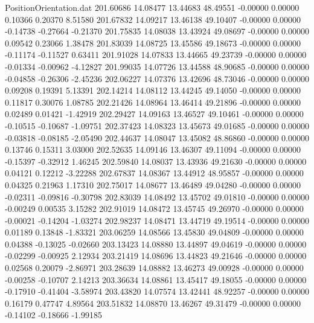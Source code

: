\begin{filecontents}{PositionOrientation.dat}
 201.60686   14.08477   13.44683    48.49551   -0.00000    0.00000    0.10366    0.20370    8.51580
 201.67832   14.09217   13.46138    49.10407   -0.00000    0.00000   -0.14738   -0.27664   -0.21370
 201.75835   14.08038   13.43924    49.08697   -0.00000    0.00000    0.09542    0.23066    1.38478
 201.83039   14.08725   13.45586    49.18673   -0.00000    0.00000   -0.11174   -0.11527    0.63411
 201.91028   14.07833   13.44665    49.23739   -0.00000    0.00000   -0.01334   -0.00962   -4.12827
 201.99035   14.07726   13.44588    48.90685   -0.00000    0.00000   -0.04858   -0.26306   -2.45236
 202.06227   14.07376   13.42696    48.73046   -0.00000    0.00000    0.09208    0.19391    5.13391
 202.14214   14.08112   13.44245    49.14050   -0.00000    0.00000    0.11817    0.30076    1.08785
 202.21426   14.08964   13.46414    49.21896   -0.00000    0.00000    0.02489    0.01421   -1.42919
 202.29427   14.09163   13.46527    49.10461   -0.00000    0.00000   -0.10515   -0.10687   -1.09751
 202.37423   14.08323   13.45673    49.01685   -0.00000    0.00000   -0.03818   -0.08185   -2.05490
 202.44637   14.08047   13.45082    48.86860   -0.00000    0.00000    0.13746    0.15311    3.03000
 202.52635   14.09146   13.46307    49.11094   -0.00000    0.00000   -0.15397   -0.32912    1.46245
 202.59840   14.08037   13.43936    49.21630   -0.00000    0.00000    0.04121    0.12212   -3.22288
 202.67837   14.08367   13.44912    48.95857   -0.00000    0.00000    0.04325    0.21963    1.17310
 202.75017   14.08677   13.46489    49.04280   -0.00000    0.00000   -0.02311   -0.09816   -0.30798
 202.83039   14.08492   13.45702    49.01810   -0.00000    0.00000   -0.00249    0.00535    3.15282
 202.91019   14.08472   13.45745    49.26970   -0.00000    0.00000   -0.00021   -0.14204   -1.03274
 202.98237   14.08471   13.44719    49.19514   -0.00000    0.00000    0.01189    0.13848   -1.83321
 203.06259   14.08566   13.45830    49.04809   -0.00000    0.00000    0.04388   -0.13025   -0.02660
 203.13423   14.08880   13.44897    49.04619   -0.00000    0.00000   -0.02299   -0.00925    2.12934
 203.21419   14.08696   13.44823    49.21646   -0.00000    0.00000    0.02568    0.20079   -2.86971
 203.28639   14.08882   13.46273    49.00928   -0.00000    0.00000   -0.00258   -0.10707    2.14213
 203.36634   14.08861   13.45417    49.18055   -0.00000    0.00000   -0.17910   -0.41404   -3.58974
 203.43820   14.07574   13.42441    48.92257   -0.00000    0.00000    0.16179    0.47747    4.89564
 203.51832   14.08870   13.46267    49.31479   -0.00000    0.00000   -0.14102   -0.18666   -1.99185

\end{filecontents}
